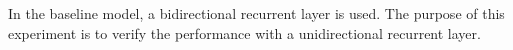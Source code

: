 
In the baseline model, a bidirectional recurrent layer is
used. The purpose of this experiment is to verify the
performance with a unidirectional recurrent layer.

